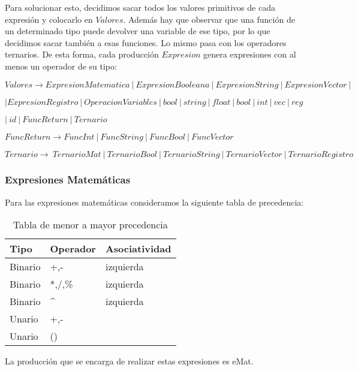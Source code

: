 Para solucionar esto, decidimos sacar todos los valores primitivos de cada expresión y colocarlo en $Valores$. Además hay que observar que una función de un determinado tipo puede devolver una variable de ese tipo, por lo que decidimos sacar también a esas funciones. Lo mismo pasa con los operadores ternarios. De esta forma, cada producción $Expresion$ genera expresiones con al menos un operador de su tipo:

$Valores \rightarrow ExpresionMatematica \ | \ ExpresionBooleana \  | \ ExpresionString \  | \ ExpresionVector \ | \  $

\hspace{15mm} $| ExpresionRegistro  \ | \ OperacionVariables \ | \ bool \ | \ string \ | \ float \ | \ bool \ | \ int \ | \ vec \ | \ reg  $

\hspace{15mm} $| \ id \ | \ FuncReturn \ | \ Ternario $

$FuncReturn \rightarrow FuncInt \ | \ FuncString \ | \ FuncBool \ | \ FuncVector $

$Ternario \rightarrow  \ TernarioMat \ | \ TernarioBool \ | \ TernarioString \ | \ TernarioVector \ | \ TernarioRegistro $


\subsubsection{Expresiones Matemáticas}
Para las expresiones matemáticas consideramos la siguiente tabla de precedencia:

\begin{table}[htbp]
\begin{center}
\begin{tabular}{|l|l|l|}
\hline
Tipo & Operador & Asociatividad \\
\hline \hline
Binario & +,- & izquierda \\ \hline
Binario & *,/,\% & izquierda \\ \hline
Binario & \^{} & izquierda \\ \hline
Unario & +,- &  \\ \hline
Unario & () &  \\ \hline

\end{tabular}
\caption{Tabla de menor a mayor precedencia}
\label{Precedencia}
\end{center}
\end{table}

La producción que se encarga de realizar estas expresiones es eMat. 

